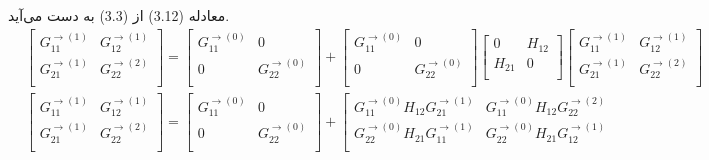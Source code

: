 معادله (3.12) از (3.3) به دست می‌آید.
\begin{equation}
‌   \begin{split}
          & \left[ \begin{matrix}
           G_{11}^{\to (1)} & G_{12}^{\to (1)}  \\
           G_{21}^{\to (1)} & G_{22}^{\to (2)}  \\
        \end{matrix} \right]=\left[ \begin{matrix}
           G_{11}^{\to (0)} & 0  \\
           0 & G_{22}^{\to (0)}  \\
        \end{matrix} \right]+\left[ \begin{matrix}
           G_{11}^{\to (0)} & 0  \\
           0 & G_{22}^{\to (0)}  \\
        \end{matrix} \right]\left[ \begin{matrix}
           0 & {{H}_{12}}  \\
           {{H}_{21}} & 0  \\
        \end{matrix} \right]\left[ \begin{matrix}
           G_{11}^{\to (1)} & G_{12}^{\to (1)}  \\
           G_{21}^{\to (1)} & G_{22}^{\to (2)}  \\
        \end{matrix} \right] \\ 
         & \left[ \begin{matrix}
           G_{11}^{\to (1)} & G_{12}^{\to (1)}  \\
           G_{21}^{\to (1)} & G_{22}^{\to (2)}  \\
        \end{matrix} \right]=\left[ \begin{matrix}
           G_{11}^{\to (0)} & 0  \\
           0 & G_{22}^{\to (0)}  \\
        \end{matrix} \right]+\left[ \begin{matrix}
           G_{11}^{\to (0)}{{H}_{12}}G_{21}^{\to (1)} & G_{11}^{\to (0)}{{H}_{12}}G_{22}^{\to (2)}  \\
           G_{22}^{\to (0)}{{H}_{21}}G_{11}^{\to (1)} & G_{22}^{\to (0)}{{H}_{21}}G_{12}^{\to (1)}  \\

\end{matrix}
\end{split}
\end{equation}
